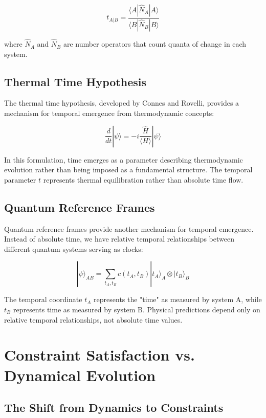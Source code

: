 \documentclass[12pt]{article}
\begin{document}
\begin{equation}
t_{A|B} = \frac{\langle A|\hat{N}_A|A\rangle}{\langle B|\hat{N}_B|B\rangle}
\end{equation}

where $\hat{N}_A$ and $\hat{N}_B$ are number operators that count quanta of change in each system.

\subsection{Thermal Time Hypothesis}

The thermal time hypothesis, developed by Connes and Rovelli, provides a mechanism for temporal emergence from thermodynamic concepts:

\begin{equation}
\frac{d}{dt}|\psi\rangle = -i\frac{\hat{H}}{\langle H\rangle}|\psi\rangle
\end{equation}

In this formulation, time emerges as a parameter describing thermodynamic evolution rather than being imposed as a fundamental structure. The temporal parameter $t$ represents thermal equilibration rather than absolute time flow.

\subsection{Quantum Reference Frames}

Quantum reference frames provide another mechanism for temporal emergence. Instead of absolute time, we have relative temporal relationships between different quantum systems serving as clocks:

\begin{equation}
|\psi\rangle_{AB} = \sum_{t_A,t_B} c(t_A,t_B)|t_A\rangle_A \otimes |t_B\rangle_B
\end{equation}

The temporal coordinate $t_A$ represents the "time" as measured by system A, while $t_B$ represents time as measured by system B. Physical predictions depend only on relative temporal relationships, not absolute time values.

\section{Constraint Satisfaction vs. Dynamical Evolution}

\subsection{The Shift from Dynamics to Constraints}
\end{document}
